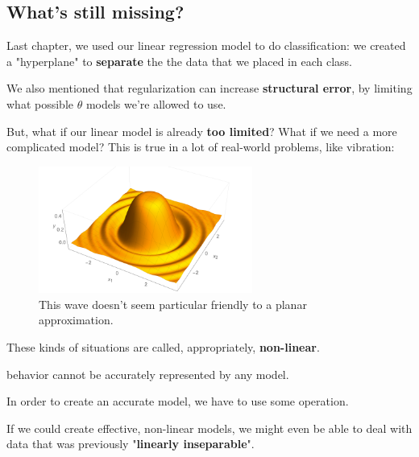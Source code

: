     \subsection*{What's still missing?}
    
        Last chapter, we used our linear regression model to do classification: we created a "hyperplane" to \textbf{separate} the the data that we placed in each class. 
    
        We also mentioned that regularization can increase \textbf{structural error}, by limiting what possible $\theta$ models we're allowed to use. 
    
        But, what if our linear model is already \textbf{too limited}? What if we need a more complicated model? This is true in a lot of real-world problems, like vibration:
    
        \begin{figure}[H]
            \centering
            
            \includegraphics[width=70mm,scale=0.5]{images/feature_images/nonlinear_example.png}
            \caption*{This wave doesn't seem particular friendly to a planar approximation.}
        \end{figure}
    
        These kinds of situations are called, appropriately, \textbf{non-linear}.\\
    
        \begin{concept}
             behavior cannot be accurately represented by any  model. 
    
            In order to create an accurate model, we have to use some  operation.
        \end{concept}
    
        If we could create effective, non-linear models, we might even be able to deal with data that was previously "\textbf{linearly inseparable}".

